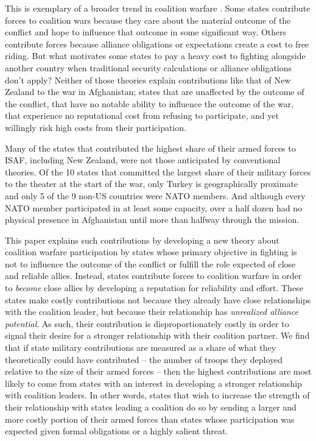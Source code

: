 \documentclass[12pt,letterpaper]{article}
\begin{document}
	This is exemplary of a broader trend in coalition warfare \citep{vonhlatky_greatasymmetryamerica_2010}. Some states contribute forces to coalition wars because they care about the material outcome of the conflict and hope to influence that outcome in some significant way. Others contribute forces because alliance obligations or expectations create a cost to free riding. But what motivates some states to pay a heavy cost to fighting alongside another country when traditional security calculations or alliance obligations don't apply? Neither of those theories explain contributions like that of New Zealand to the war in Afghanistan; states that are unaffected by the outcome of the conflict, that have no notable ability to influence the outcome of the war, that experience no reputational cost from refusing to participate, and yet willingly risk high costs from their participation.
	
	Many of the states that contributed the highest share of their armed forces to ISAF, including New Zealand, were not those anticipated by conventional theories. Of the 10 states that committed the largest share of their military forces to the theater at the start of the war, only Turkey is geographically proximate and only 5 of the 9 non-US countries were NATO members. And although every NATO member participated in at least some capacity, over a half dozen had no physical presence in Afghanistan until more than halfway through the mission.

	This paper explains such contributions by developing a new theory about coalition warfare participation by states whose primary objective in fighting is not to influence the outcome of the conflict or fulfill the role expected of close and reliable allies. Instead, states contribute forces to coalition warfare in order to \textit{become} close allies by developing a reputation for reliability and effort. These states make costly contributions not because they already have close relationships with the coalition leader, but because their relationship has \textit{unrealized alliance potential}. As such, their contribution is disproportionately costly in order to signal their desire for a stronger relationship with their coalition partner. We find that if state military contributions are measured as a share of what they theoretically could have contributed -- the number of troops they deployed relative to the size of their armed forces -- then the highest contributions are most likely to come from states with an interest in developing a stronger relationship with coalition leaders. In other words, states that wish to increase the strength of their relationship with states leading a coalition do so by sending a larger and more costly portion of their armed forces than states whose participation was expected given formal obligations or a highly salient threat.
	
\end{document}
